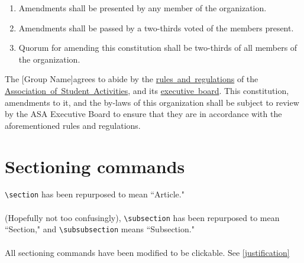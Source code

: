 \documentclass{constitution}
\def\groupname{[Group Name]}
\begin{document}
\begin{enumerate}
    \item Amendments shall be presented by any member of the organization.

    \item Amendments shall be passed by a two-thirds voted of the members present.

    \item Quorum for amending this constitution shall be two-thirds of all members of the organization.
\end{enumerate}

The \groupname agrees to abide by the \href{https://asa.mit.edu/asa-policies}{rules~and~regulations} of the \href{https://asa.mit.edu/}{Association~of~Student~Activities}, and its \href{https://asa.mit.edu/about-asa/board-members}{executive~board}.
This constitution, amendments to it, and the by-laws of this organization shall be subject to review by the ASA Executive Board to ensure that they are in accordance with the aforementioned rules and regulations.

\section{Sectioning commands}
\verb|\section| has been repurposed to mean ``Article."
\\
\\
(Hopefully not too confusingly), \verb|\subsection| has been repurposed to mean ``Section," and \verb|\subsubsection| means ``Subsection."
\\
\\
All sectioning commands have been modified to be clickable.
See \ref{justification}
\end{document}
